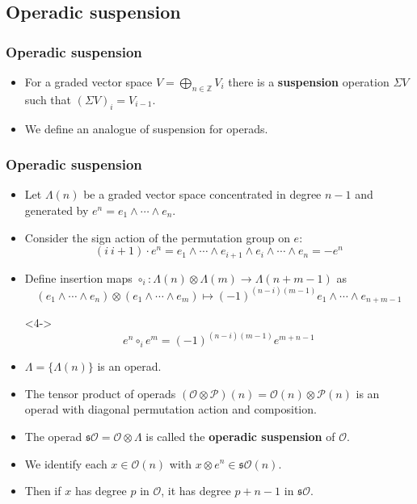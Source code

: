\documentclass{beamer}
\theoremstyle{definition}
\newcommand{\Z}{\mathbb{Z}}
\begin{document}
\subsection{Operadic suspension}
\begin{frame}
\frametitle{Operadic suspension}
\begin{itemize}
\item<1-> For a graded vector space $V=\bigoplus_{n\in\Z} V_i$ there is a \textbf{suspension} operation $\Sigma V$ such that $(\Sigma V)_i=V_{i-1}$. %
\item<2-> We define an analogue of suspension for operads.
\end{itemize}
\end{frame}
\begin{frame}
\frametitle{Operadic suspension}
\begin{itemize}
\item<1-> Let $\Lambda(n)$ be a graded vector space concentrated in degree $n-1$ and generated by $e^n=e_1\land\cdots\land e_n$.
\item<2-> Consider the sign action of the permutation group on $e$:
\[(i\ i+1)\cdot e^n=e_1\land\cdots\land e_{i+1}\land e_i\land\cdots\land e_n=-e^n\]
\item<3-> Define insertion maps $\circ_i:\Lambda(n)\otimes\Lambda(m)\to\Lambda(n+m-1)$ as
\[(e_1\land\cdots\land e_n)\otimes(e_1\land\cdots\land e_m)\mapsto  (-1)^{(n-i)(m-1)}e_1\land\cdots\land e_{n+m-1}\]
\item[]<4-> \[e^n\circ_i e^m= (-1)^{(n-i)(m-1)}e^{m+n-1}\]
\end{itemize}
\end{frame}

\begin{frame}
\begin{itemize}
\item<1-> $\Lambda=\{\Lambda(n)\}$ is an operad.
\item<2-> The tensor product of operads $(\mathcal{O}\otimes \mathcal{P})(n)=\mathcal{O}(n)\otimes \mathcal{P}(n)$ is an operad with diagonal permutation action and composition. %
\item<3-> The operad $\mathfrak{s}\mathcal{O}=\mathcal{O}\otimes\Lambda$ is called the \textbf{operadic suspension} of $\mathcal{O}$.
\item<4-> We identify each $x\in\mathcal{O}(n)$ with $x\otimes e^n\in \mathfrak{s}\mathcal{O}(n)$.
\item<5-> Then if $x$ has degree $p$ in $\mathcal{O}$, it has degree $p+n-1$ in $\mathfrak{s}\mathcal{O}$.
\end{itemize}
\end{frame}
\end{document}
